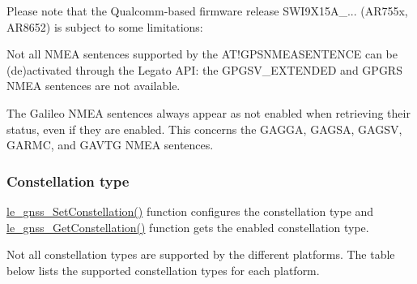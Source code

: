 Please note that the Qualcomm-\/based firmware release {\ttfamily S\+W\+I9\+X15\+A\+\_...} (A\+R755x, A\+R8652) is subject to some limitations\+:
\begin{DoxyItemize}
\item Not all N\+M\+EA sentences supported by the A\+T!\+G\+P\+S\+N\+M\+E\+A\+S\+E\+N\+T\+E\+N\+CE can be (de)activated through the Legato A\+PI\+: the {\ttfamily G\+P\+G\+S\+V\+\_\+\+E\+X\+T\+E\+N\+D\+ED} and {\ttfamily G\+P\+G\+RS} N\+M\+EA sentences are not available.
\item The Galileo N\+M\+EA sentences always appear as not enabled when retrieving their status, even if they are enabled. This concerns the {\ttfamily G\+A\+G\+GA}, {\ttfamily G\+A\+G\+SA}, {\ttfamily G\+A\+G\+SV}, {\ttfamily G\+A\+R\+MC}, and {\ttfamily G\+A\+V\+TG} N\+M\+EA sentences.
\end{DoxyItemize}\hypertarget{platformConstraintsGnss_platformConstraintsGnss_ConstellationType}{}\subsubsection{Constellation type}\label{platformConstraintsGnss_platformConstraintsGnss_ConstellationType}
{\ttfamily \hyperlink{le__gnss__interface_8h_a6dbdc58f23e480e65ea16c583ef5340f}{le\+\_\+gnss\+\_\+\+Set\+Constellation()}} function configures the constellation type and {\ttfamily \hyperlink{le__gnss__interface_8h_a150835481ab3751e3ab1821362e34e84}{le\+\_\+gnss\+\_\+\+Get\+Constellation()}} function gets the enabled constellation type.

Not all constellation types are supported by the different platforms. The table below lists the supported constellation types for each platform.

